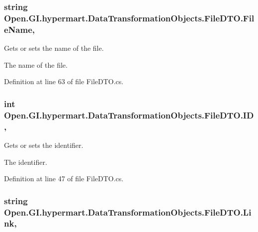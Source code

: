 \subsubsection[{File\+Name}]{\setlength{\rightskip}{0pt plus 5cm}string Open.\+G\+I.\+hypermart.\+Data\+Transformation\+Objects.\+File\+D\+T\+O.\+File\+Name\hspace{0.3cm}{\ttfamily [get]}, {\ttfamily [set]}}\label{class_open_1_1_g_i_1_1hypermart_1_1_data_transformation_objects_1_1_file_d_t_o_a55fb34aacab9513037108ff3f1d287a8}


Gets or sets the name of the file. 

The name of the file. 

Definition at line 63 of file File\+D\+T\+O.\+cs.

\hypertarget{class_open_1_1_g_i_1_1hypermart_1_1_data_transformation_objects_1_1_file_d_t_o_ab187e7f070650067d055de8f707e1eed}{}
\subsubsection[{I\+D}]{\setlength{\rightskip}{0pt plus 5cm}int Open.\+G\+I.\+hypermart.\+Data\+Transformation\+Objects.\+File\+D\+T\+O.\+I\+D\hspace{0.3cm}{\ttfamily [get]}, {\ttfamily [set]}}\label{class_open_1_1_g_i_1_1hypermart_1_1_data_transformation_objects_1_1_file_d_t_o_ab187e7f070650067d055de8f707e1eed}


Gets or sets the identifier. 

The identifier. 

Definition at line 47 of file File\+D\+T\+O.\+cs.

\hypertarget{class_open_1_1_g_i_1_1hypermart_1_1_data_transformation_objects_1_1_file_d_t_o_af58091e5ba2e9fde7db92f08dc4d3a41}{}
\subsubsection[{Link}]{\setlength{\rightskip}{0pt plus 5cm}string Open.\+G\+I.\+hypermart.\+Data\+Transformation\+Objects.\+File\+D\+T\+O.\+Link\hspace{0.3cm}{\ttfamily [get]}, {\ttfamily [set]}}\label{class_open_1_1_g_i_1_1hypermart_1_1_data_transformation_objects_1_1_file_d_t_o_af58091e5ba2e9fde7db92f08dc4d3a41}



